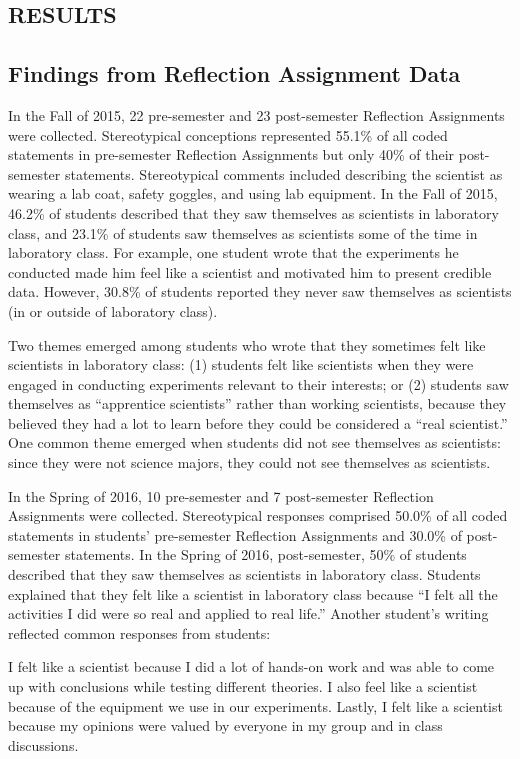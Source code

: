 \documentclass[11.5pt]{sig-alternate} %
\begin{document}
\begin{large}
\section*{RESULTS}

\subsection*{Findings from Reflection Assignment Data}

In the Fall of 2015, 22 pre-semester and 23 post-semester Reflection Assignments were collected. Stereotypical conceptions represented 55.1\% of all coded statements in pre-semester Reflection Assignments but only 40\% of their post-semester statements. Stereotypical comments included describing the scientist as wearing a lab coat, safety goggles, and using lab equipment. In the Fall of 2015, 46.2\% of students described that they saw themselves as scientists in laboratory class, and 23.1\% of students saw themselves as scientists some of the time in laboratory class. For example, one student wrote that the experiments he conducted made him feel like a scientist and motivated him to present credible data. However, 30.8\% of students reported they never saw themselves as scientists (in or outside of laboratory class). 

Two themes emerged among students who wrote that they sometimes felt like scientists in laboratory class: (1) students felt like scientists when they were engaged in conducting experiments relevant to their interests; or (2) students saw themselves as “apprentice scientists” rather than working scientists, because they believed they had a lot to learn before they could be considered a “real scientist.” One common theme emerged when students did not see themselves as scientists: since they were not science majors, they could not see themselves as scientists. 

In the Spring of 2016, 10 pre-semester and 7 post-semester Reflection Assignments were collected. Stereotypical responses comprised 50.0\% of all coded statements in students’ pre-semester Reflection Assignments and 30.0\% of post-semester statements. In the Spring of 2016, post-semester, 50\% of students described that they saw themselves as scientists in laboratory class. Students explained that they felt like a scientist in laboratory class because “I felt all the activities I did were so real and applied to real life.” Another student’s writing reflected common responses from students:

I felt like a scientist because I did a lot of hands-on work and was able to come up with conclusions while testing different theories. I also feel like a scientist because of the equipment we use in our experiments. Lastly, I felt like a scientist because my opinions were valued by everyone in my group and in class discussions. 


\end{large}
\end{document}
